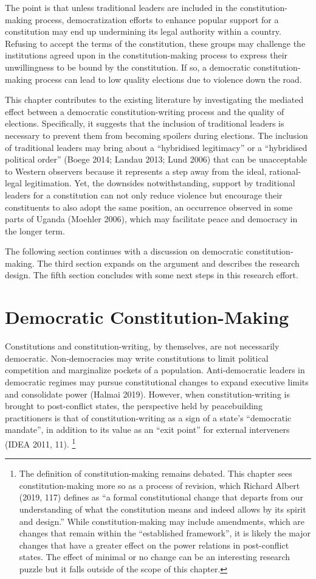 \documentclass [11pt]{article}
\begin{document}
The point is that unless traditional leaders are included in the constitution-making process, democratization efforts to enhance popular support for a constitution may end up undermining its legal authority within a country. Refusing to accept the terms of the constitution, these groups may challenge the institutions agreed upon in the constitution-making process to express their unwillingness to be bound by the constitution. If so, a democratic constitution-making process can lead to low quality elections due to violence down the road.

This chapter contributes to the existing literature by investigating the mediated effect between a democratic constitution-writing process and the quality of elections. Specifically, it suggests that the inclusion of traditional leaders is necessary to prevent them from becoming spoilers during elections. The inclusion of traditional leaders may bring about a ``hybridised legitimacy'' or a ``hybridised political order'' (Boege 2014; Landau 2013; Lund 2006) that can be unacceptable to Western observers because it represents a step away from the ideal, rational-legal legitimation. Yet, the downsides notwithstanding, support by traditional leaders for a constitution can not only reduce violence but encourage their constituents to also adopt the same position, an occurrence observed in some parts of Uganda (Moehler 2006), which may facilitate peace and democracy in the longer term. %

The following section continues with a discussion on democratic constitution-making. The third section  expands on the argument and describes the research design. The fifth section concludes with some next steps in this research effort.

\section*{Democratic Constitution-Making}

Constitutions and constitution-writing, by themselves, are not necessarily democratic. Non-democracies may write constitutions to limit political competition and marginalize pockets of a population. Anti-democratic leaders in democratic regimes may pursue constitutional changes to expand executive limits and consolidate power (Halmai 2019). However, when constitution-writing is brought to post-conflict states, the perspective held by peacebuilding practitioners is that of constitution-writing as a sign of a state's ``democratic mandate'', in addition to its value as an ``exit point'' for external interveners (IDEA 2011, 11). \footnote{The definition of constitution-making remains debated. This chapter sees constitution-making more so as a process of revision, which Richard Albert (2019, 117) defines as ``a formal constitutional change that departs from our understanding of what the constitution means and indeed allows by its spirit and design.'' While constitution-making may include amendments, which are changes that remain within the ``established framework'', it is likely the major changes that have a greater effect on the power relations in post-conflict states. The effect of minimal or no change can be an interesting research puzzle but it falls outside of the scope of this chapter.}
\end{document}
